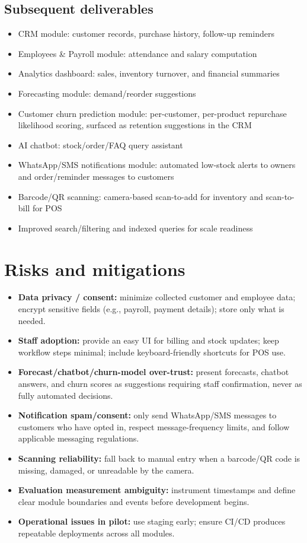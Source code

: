 \documentclass[11pt,a4paper]{article}
\begin{document}
\subsection{Subsequent deliverables}
\begin{itemize}[leftmargin=0.7cm]
    \item CRM module: customer records, purchase history, follow-up reminders
    \item Employees \& Payroll module: attendance and salary computation
    \item Analytics dashboard: sales, inventory turnover, and financial summaries
    \item Forecasting module: demand/reorder suggestions
    \item Customer churn prediction module: per-customer, per-product repurchase likelihood scoring, surfaced as retention suggestions in the CRM
    \item AI chatbot: stock/order/FAQ query assistant
    \item WhatsApp/SMS notifications module: automated low-stock alerts to owners and order/reminder messages to customers
    \item Barcode/QR scanning: camera-based scan-to-add for inventory and scan-to-bill for POS
    \item Improved search/filtering and indexed queries for scale readiness
\end{itemize}

\section{Risks and mitigations}
\begin{itemize}[leftmargin=0.7cm]
    \item \textbf{Data privacy / consent:} minimize collected customer and employee data; encrypt sensitive fields (e.g., payroll, payment details); store only what is needed.
    \item \textbf{Staff adoption:} provide an easy UI for billing and stock updates; keep workflow steps minimal; include keyboard-friendly shortcuts for POS use.
    \item \textbf{Forecast/chatbot/churn-model over-trust:} present forecasts, chatbot answers, and churn scores as suggestions requiring staff confirmation, never as fully automated decisions.
    \item \textbf{Notification spam/consent:} only send WhatsApp/SMS messages to customers who have opted in, respect message-frequency limits, and follow applicable messaging regulations.
    \item \textbf{Scanning reliability:} fall back to manual entry when a barcode/QR code is missing, damaged, or unreadable by the camera.
    \item \textbf{Evaluation measurement ambiguity:} instrument timestamps and define clear module boundaries and events before development begins.
    \item \textbf{Operational issues in pilot:} use staging early; ensure CI/CD produces repeatable deployments across all modules.
\end{itemize}
\end{document}

